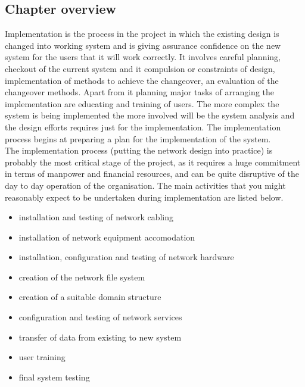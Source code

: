 \documentclass[12pt,a4paper]{article}
\newcommand\tab[1][.7cm]{\hspace*{#1}}
\begin{document}
	\subsection{Chapter overview}
	\tab Implementation is the process in the project in which the existing design is changed into working system and is giving assurance confidence on the new system for the users that it will work correctly. It involves careful planning, checkout of the current system and it compulsion or constraints of design, implementation of methods to achieve the changeover, an evaluation of the changeover methods. Apart from it planning major tasks of arranging the implementation are educating and training of users. The more complex the system is being implemented the more involved will be the system analysis and the design efforts requires just for the implementation. The implementation process begins at preparing a plan for the implementation of the system.\\\tab The implementation\cite{Ref:21} process (putting the network design into practice) is probably the most critical stage of the project, as it requires a huge commitment in terms of manpower and financial resources, and can be quite disruptive of the day to day operation of the organisation. The main activities that you might reasonably expect to be undertaken during implementation are listed below.\\
	\begin{itemize}
		\item installation and testing of network cabling
		\item installation of network equipment accomodation
		\item installation, configuration and testing of network hardware
		\item creation of the network file system
		\item creation of a suitable domain structure
		\item configuration and testing of network services
		\item transfer of data from existing to new system
		\item user training
		\item final system testing
	\end{itemize}
\end{document}
